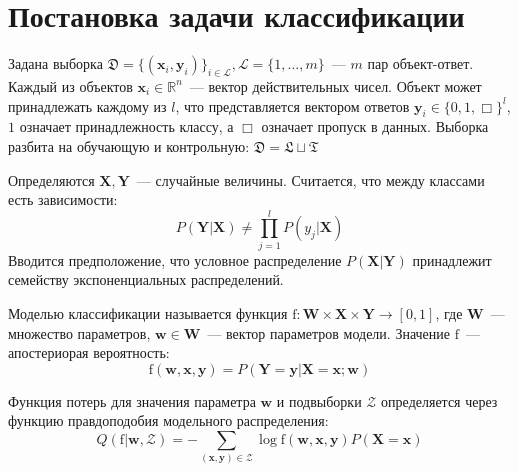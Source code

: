 \documentclass[12pt,twoside]{article}
\newcommand{\x}{\mathbf{x}}
\newcommand{\w}{\mathbf{w}}
\newcommand{\W}{\mathbf{W}}
\newcommand{\y}{\mathbf{y}}
\newcommand{\X}{\mathbf{X}}
\newcommand{\Y}{\mathbf{Y}}
\newcommand{\fx}{\mathbf{f}}
\newcommand{\fs}{\mbox{f}}
\begin{document}
\section{Постановка задачи классификации}
Задана выборка $\mathfrak{D}=\{(\x_i,\y_i)\}_{i\in \mathcal{L}}, \mathcal{L}=\{1,\dots, m\}$~--- $m$ пар объект-ответ. Каждый из объектов $\x_i\in \mathbb{R}^n$~--- вектор действительных чисел. Объект может принадлежать каждому из $l$, что представляется вектором ответов $\y_i\in \{0,1,\Box\}^l$, $1$ означает принадлежность классу, а $\Box$ означает пропуск в данных. Выборка разбита на обучающую и контрольную: $\mathfrak{D}=\mathfrak{L}\sqcup\mathfrak{T}$


Определяются $\X, \Y$~--- случайные величины.
Считается, что между классами есть зависимости:
$$P(\Y|\X)\neq \prod_{j=1}^l P(y_j|\X)$$
Вводится предположение, что условное распределение $P(\X|\Y)$ принадлежит семейству экспоненциальных распределений.



Моделью классификации называется функция $\fs\colon \W\times\X\times\Y\to [0,1]$, где $\W$~--- множество параметров, $\w\in\W$~--- вектор параметров модели. Значение $\fs$~--- апостериорая вероятность:
$$\fs(\w,\x,\y)=P(\Y=\y|\X=\x;\w)$$


Функция потерь для значения параметра $\w$ и подвыборки $\mathcal{Z}$ определяется через функцию правдоподобия модельного распределения:
$$Q(\fs|\w, \mathcal{Z})=-\sum_{(\x,\y)\in\mathcal{Z}}\log \fs(\w,\x,\y)P(\X=\x)$$
\end{document}
